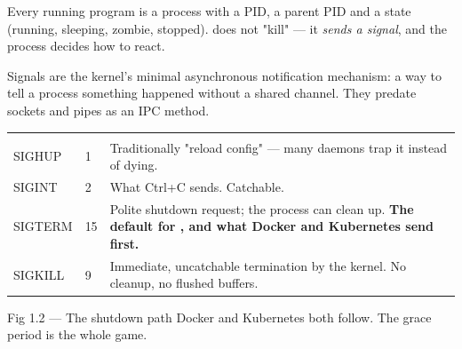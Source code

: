 
 Every running program is a process with a PID, a parent PID and a state (running, sleeping, zombie, stopped).  does not "kill" --- it \emph{sends a signal}, and the process decides how to react.

 Signals are the kernel's minimal asynchronous notification mechanism: a way to tell a process something happened without a shared channel. They predate sockets and pipes as an IPC method.

\begin{center}\small
\wbrowcolors
\begin{tabularx}{\linewidth}{@{}L{20mm} C{14mm} X@{}}
 &  & \\
SIGHUP & 1 & Traditionally "reload config" --- many daemons trap it instead of dying.\\
SIGINT & 2 & What Ctrl+C sends. Catchable.\\
SIGTERM & 15 & Polite shutdown request; the process can clean up. \textbf{The default for , and what Docker and Kubernetes send first.}\\
SIGKILL & 9 & Immediate, uncatchable termination by the kernel. No cleanup, no flushed buffers.\\
\end{tabularx}
\end{center}

\begin{wbfigure}{Fig 1.2 — The shutdown path Docker and Kubernetes both follow. The grace period is the whole game.}
\end{wbfigure}

